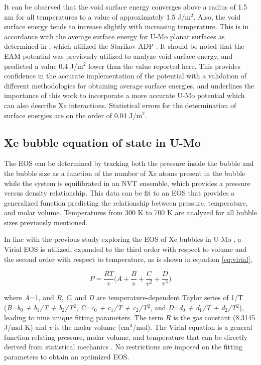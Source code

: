 \documentclass[review]{elsarticle}
\begin{document}
\noindent It can be observed that the void surface energy converges above a radius of 1.5 nm for all temperatures to a value of approximately 1.5 J/m$^2$. Also, the void surface energy tends to increase slightly with increasing temperature. This is in accordance with the average surface energy for U-Mo planar surfaces as determined in \cite{beeler2018}, which utilized the Starikov ADP \cite{starikov2018}. It should be noted that the EAM potential was previously utilized to analyze void surface energy, and predicted a value 0.4 J/m$^2$ lower than the value reported here. This provides confidence in the accurate implementation of the potential with a validation of different methodologies for obtaining average surface energies, and underlines the importance of this work to incorporate a more accurate U-Mo potential which can also describe Xe interactions. Statistical errors for the determination of surface energies are on the order of 0.04 J/m$^2$. 

\subsection{Xe bubble equation of state in U-Mo}

The EOS can be determined by tracking both the pressure inside the bubble and the bubble size as a function of the number of Xe atoms present in the bubble while the system is equilibrated in an NVT ensemble, which provides a pressure versus density relationship. This data can be fit to an EOS that provides a generalized function predicting the relationship between pressure, temperature, and molar volume. Temperatures from 300 K to 700 K are analyzed for all bubble sizes previously mentioned. 

In line with the previous study exploring the EOS of Xe bubbles in U-Mo \cite{Beeler2020}, a Virial EOS is utilized, expanded to the third order with respect to volume and the second order with respect to temperature, as is shown in equation \cref{eq:virial}, 

\begin{equation}
\label{eq:virial}
P=\frac{RT}{v}\bigg( A + \frac{B}{v} + \frac{C}{v^2} + \frac{D}{v^3} \bigg)
\end{equation}

\noindent where \textit{A}=1, and \textit{B}, \textit{C}, and \textit{D} are temperature-dependent Taylor series of 1/T (\textit{B=b$_0$ + b$_1$/T + b$_2$/T$^2$}, \textit{C=c$_0$ + c$_1$/T + c$_2$/T$^2$}, and \textit{D=d$_0$ + d$_1$/T + d$_2$/T$^2$}), leading to nine unique fitting parameters. The term $R$ is the gas constant (8.3145 J/mol-K) and $v$ is the molar volume (cm$^3$/mol). The Virial equation is a general function relating pressure, molar volume, and temperature that can be directly derived from statistical mechanics \cite{virial}. No restrictions are imposed on the fitting parameters to obtain an optimized EOS. 
\end{document}

